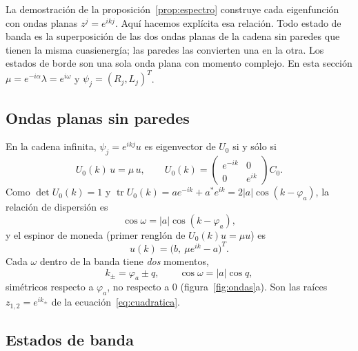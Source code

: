 \documentclass[11pt,a4paper]{article}
\theoremstyle{remark}
\begin{document}
La demostración de la proposición~\ref{prop:espectro} construye cada
eigenfunción con ondas planas $z^j=e^{ikj}$. Aquí hacemos explícita esa
relación. Todo estado de banda es la superposición de las dos ondas planas de la
cadena sin paredes que tienen la misma cuasienergía; las paredes las convierten
una en la otra. Los estados de borde son una sola onda plana con momento
complejo. En esta sección $\mu=e^{-i\alpha}\lambda=e^{i\omega}$ y
$\psi_j=(R_j,L_j)^T$.

\subsection{Ondas planas sin paredes}

En la cadena infinita, $\psi_j=e^{ikj}u$ es eigenvector de $U_0$ si y sólo si
\begin{equation}
U_0(k)\,u=\mu\,u,\qquad
U_0(k)=\begin{pmatrix}e^{-ik}&0\\0&e^{ik}\end{pmatrix}C_0 .
\end{equation}
Como $\det U_0(k)=1$ y $\operatorname{tr}U_0(k)=ae^{-ik}+a^*e^{ik}=2|a|\cos(k-\varphi_a)$,
la relación de dispersión es
\begin{equation}
\cos\omega=|a|\cos(k-\varphi_a),
\label{eq:disp}
\end{equation}
y el espinor de moneda (primer renglón de $U_0(k)u=\mu u$) es
\begin{equation}
u(k)=\bigl(b,\ \mu e^{ik}-a\bigr)^T .
\label{eq:espinor}
\end{equation}
Cada $\omega$ dentro de la banda tiene \emph{dos} momentos,
\begin{equation}
k_\pm=\varphi_a\pm q,\qquad \cos\omega=|a|\cos q,
\end{equation}
simétricos respecto a $\varphi_a$, no respecto a $0$
(figura~\ref{fig:ondas}a). Son las raíces $z_{1,2}=e^{ik_\pm}$ de la
ecuación~\eqref{eq:cuadratica}.

\subsection{Estados de banda}
\end{document}
